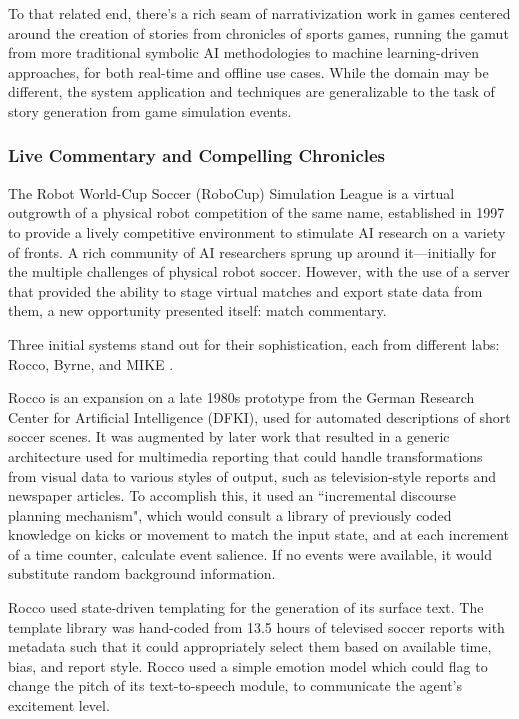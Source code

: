 To that related end, there's a rich seam of narrativization work in games centered around the creation of stories from chronicles of sports games, running the gamut from more traditional symbolic AI methodologies to machine learning-driven approaches, for both real-time and offline use cases. While the domain may be different, the system application and techniques are generalizable to the task of story generation from game simulation events.

\subsubsection{Live Commentary and Compelling Chronicles}\label{subsubsec:live-commentary-and-compelling-chronicles}

The Robot World-Cup Soccer (RoboCup) Simulation League is a virtual outgrowth of a physical robot competition of the same name, established in 1997 \cite{robocup} to provide a lively competitive environment to stimulate AI research on a variety of fronts. A rich community of AI researchers sprung up around it---initially for the multiple challenges of physical robot soccer. However, with the use of a server that provided the ability to stage virtual matches and export state data from them, a new opportunity presented itself: match commentary.

Three initial systems stand out for their sophistication, each from different labs: Rocco, Byrne, and MIKE \cite{andre2000three}.

Rocco is an expansion on a late 1980s prototype from the German Research Center for Artificial Intelligence (DFKI), used for automated descriptions of short soccer scenes. It was augmented by later work that resulted in a generic architecture used for multimedia reporting that could handle transformations from visual data to various styles of output, such as television-style reports and newspaper articles. To accomplish this, it used an ``incremental discourse planning mechanism", which would consult a library of previously coded knowledge on kicks or movement to match the input state, and at each increment of a time counter, calculate event salience. If no events were available, it would substitute random background information.

Rocco used state-driven templating for the generation of its surface text. The template library was hand-coded from 13.5 hours of televised soccer reports with metadata such that it could appropriately select them based on available time, bias, and report style. Rocco used a simple emotion model which could flag to change the pitch of its text-to-speech module, to communicate the agent's excitement level.

